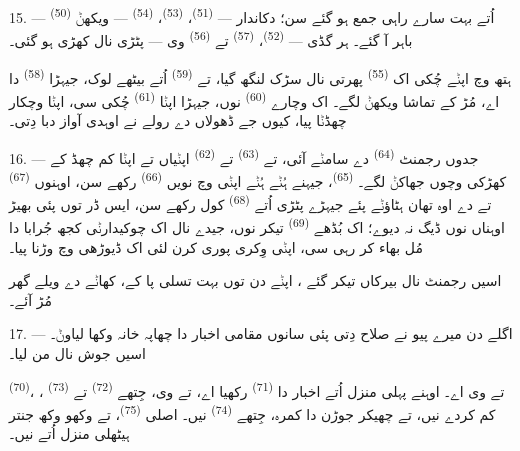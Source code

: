 15. ---  \textsuperscript{(50)} اُتے بہت سارے راہی جمع ہو گئے سن؛
دکاندار —  \textsuperscript{(51)}، 
\textsuperscript{(53)}،  \textsuperscript{(54)} — 
ویکھݨ باہر آ گئے۔ ہر گڈی —  \textsuperscript{(52)}،
 \textsuperscript{(57)} تے 
\textsuperscript{(56)} وی — پٹڑی نال کھڑی ہو گئی۔

\VUsaut{3.0mm}

ہتھ وچ اپݨے  چُکی اک 
\textsuperscript{(55)} پھرتی نال سڑک لنگھ گیا، تے 
\textsuperscript{(59)} اُتے بیٹھے لوک، جیہڑا  \textsuperscript{(58)}
دا اے، مُڑ کے تماشا ویکھݨ لگے۔ اک وچارے  \textsuperscript{(60)}
نوں، جیہڑا اپݨا  \textsuperscript{(61)} چُکی سی، اپݨا 
وچکار چھڈݨا پیا، کیوں جے ڈھولاں دے رولے نے اوہدی آواز دبا دِتی۔

16. --- جدوں رجمنٹ  \textsuperscript{(64)} دے سامݨے آئی، تے
 \textsuperscript{(63)} تے  \textsuperscript{(62)}
اپݨیاں  تے اپݨا کم چھڈ کے کھڑکی وچوں جھاکݨ لگے۔
 \textsuperscript{(65)}، جیہنے ہُݨے ہُݨے اپݨی  وچ نویں  \textsuperscript{(66)} رکھے سن، اوہنوں 
\textsuperscript{(67)} تے  دے اوہ تھان ہٹاؤݨے پئے جیہڑے پٹڑی اُتے
 \textsuperscript{(68)} کول رکھے سن، ایس ڈر توں پئی بھیڑ اوہناں
نوں ڈیگ نہ دیوے؛ اک بُڈھے  \textsuperscript{(69)} تیکر نوں،
جیدے نال اک چوکیدارݨی کجھ جُرابا دا مُل بھاء کر رہی سی، اپݨی وِکری پوری کرن لئی اک
ڈیوڑھی وچ وڑنا پیا۔

اسیں رجمنٹ نال بیرکاں تیکر گئے ، اپݨے دن توں بہت تسلی پا کے، کھاݨے دے
ویلے گھر مُڑ آئے۔

\VUsaut{3.0mm}

17. --- اگلے دن میرے پیو نے صلاح دِتی پئی سانوں مقامی اخبار دا چھاپہ خانہ وکھا
لیاوݨ۔ اسیں جوش نال من لیا۔

  \textsuperscript{(70)}،
،  تے  وی اے۔
اوہنے پہلی منزل اُتے اخبار دا  \textsuperscript{(71)} رکھیا اے،
تے  وی، جِتھے  \textsuperscript{(72)} تے
 \textsuperscript{(73)} کم کردے نیں، تے چھیکر جوڑن دا کمرہ،
جِتھے  \textsuperscript{(74)} نیں۔ اصلی 
\textsuperscript{(75)}،  تے وکھو وکھ جنتر ہیٹھلی منزل اُتے
نیں۔

